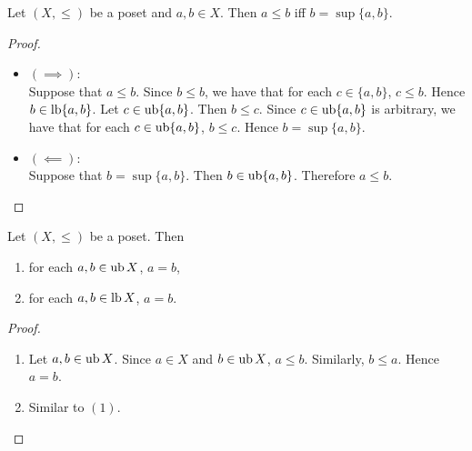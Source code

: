 \documentclass{book}
\begin{document}
	\begin{ex} 
		Let $(X, \leq)$ be a poset and $a,b \in X$. Then $a \leq b$ iff $b = \sup \{a,b\}$. 
	\end{ex}
	
	\begin{proof}\
		\begin{itemize}
			\item $(\implies)$: \\
			Suppose that $a \leq b$. Since $b \leq b$, we have that for each $c \in \{a,b\}$, $c \leq b$. Hence $b \in \operatorname{lb} \{a,b\}$. Let $c \in \operatorname{ub} \{a,b\}$. Then $b \leq c$. Since $c \in \operatorname{ub} \{a,b\}$ is arbitrary, we have that for each $c \in \operatorname{ub} \{a, b\}$, $b \leq c$. Hence $b = \sup \{a,b\}$.
			\item $(\impliedby)$: \\
			Suppose that $b = \sup \{a,b\}$. Then $b \in \operatorname{ub} \{a,b\}$. Therefore $a \leq b$. 
		\end{itemize}
	\end{proof}
	
	\begin{ex} 
		Let $(X, \leq)$ be a poset. Then 
		\begin{enumerate}
			\item for each $a,b \in \operatorname{ub} X$, $a = b$, 
			\item for each $a,b \in \operatorname{lb} X$, $a = b$.
		\end{enumerate}
	\end{ex}
	
	\begin{proof}\
		\begin{enumerate}
			\item Let $a,b \in \operatorname{ub} X$. Since $a \in X$ and $b \in \operatorname{ub} X$, $a \leq b$. Similarly, $b \leq a$. Hence $a = b$.
			\item Similar to $(1)$.
		\end{enumerate}
	\end{proof}
	
	
	
	
	
	
	
	
	
	
	
	
	
	
	
	
	
	
	
	
	
	
	
	
	
\end{document}

